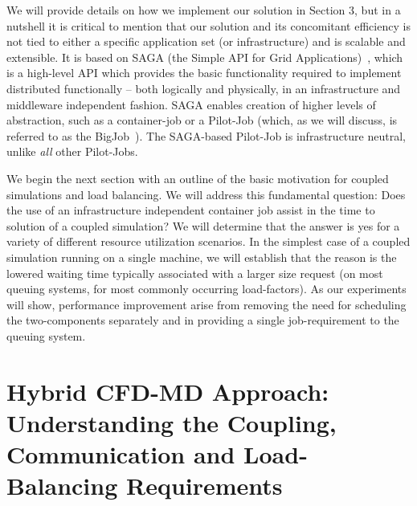 \documentclass[conference,final]{IEEEtran}
\newcommand{\jhanote}[1]{ {\textcolor{red} { ***Jha: #1 }}}
\newcommand{\skonote}[1]{ {\textcolor{blue} { ***Jeff: #1 }}}
\newcommand{\jhanote}[1]{}
\newcommand{\skonote}[1]{}
\begin{document}
We will provide details on how we implement our solution in Section 3,
but in a nutshell it is critical to mention that our solution and its
concomitant efficiency is not tied to either a specific application
set (or infrastructure) and is scalable and extensible. It is based
on SAGA (the Simple API for Grid Applications)~\cite{saga_web},
which is a high-level API which provides the basic functionality
required to implement distributed functionally -- both logically and
physically, in an infrastructure and middleware independent
fashion. SAGA enables creation of higher levels of abstraction,
such as a container-job or a Pilot-Job (which, as we will discuss, is
referred to as the BigJob~\cite{saga_royalsoc}). The SAGA-based
Pilot-Job is infrastructure neutral, unlike {\it all} other
Pilot-Jobs.

We begin the next section with an outline of the basic motivation for
coupled simulations and load balancing.  We will address this
fundamental question: Does the use of an infrastructure independent
container job assist in the time to solution of a coupled simulation? We
will determine that the answer is yes for a variety of different
resource utilization scenarios. In the simplest case of a coupled
simulation running on a single machine, we will establish that the
reason is the lowered waiting time typically associated with a larger
size request (on most queuing systems, for most commonly occurring load-factors).  As our experiments will show, performance improvement arise
from removing the need for scheduling the two-components separately
and in providing a single job-requirement to the queuing system.


\section{Hybrid CFD-MD Approach: Understanding the Coupling,
  Communication and Load-Balancing Requirements}
\end{document}
